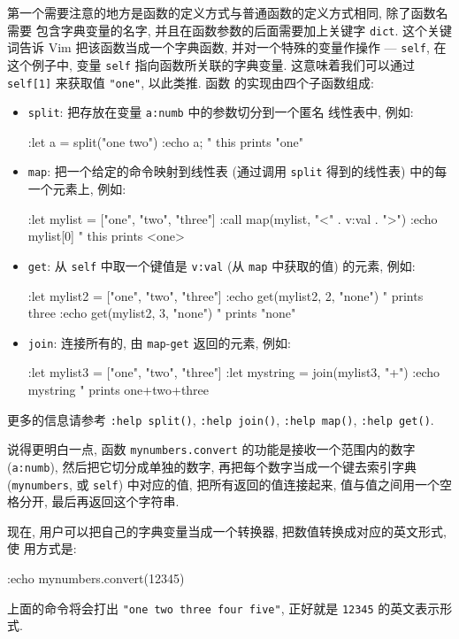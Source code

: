 第一个需要注意的地方是函数的定义方式与普通函数的定义方式相同, 除了函数名需要
包含字典变量的名字, 并且在函数参数的后面需要加上关键字 \texttt{dict}.
这个关键词告诉 Vim 把该函数当成一个字典函数, 并对一个特殊的变量作操作 ---
\texttt{self}, 在这个例子中, 变量 \texttt{self} 指向函数所关联的字典变量.
这意味着我们可以通过 \texttt{self[1]} 来获取值 \texttt{"one"}, 以此类推. 函数
的实现由四个子函数组成:
\begin{itemize}
    \item \texttt{split}: 把存放在变量 \texttt{a:numb} 中的参数切分到一个匿名
        线性表中, 例如:
    \begin{vimcode}
    :let a = split("one two")
    :echo a;    " this prints "one"
    \end{vimcode}
\item \texttt{map}: 把一个给定的命令映射到线性表 (通过调用 \texttt{split}
    得到的线性表) 中的每一个元素上, 例如:
    \begin{vimcode}
    :let mylist = ["one", "two", "three"]
    :call map(mylist, "<" . v:val . ">")
    :echo mylist[0] " this prints <one>
    \end{vimcode}
\item \texttt{get}: 从 \texttt{self} 中取一个键值是 \texttt{v:val} (从
    \texttt{map} 中获取的值) 的元素, 例如:
    \begin{vimcode}
    :let mylist2 = ["one", "two", "three"]
    :echo get(mylist2, 2, "none") " prints three
    :echo get(mylist2, 3, "none") " prints "none"
    \end{vimcode}
\item \texttt{join}: 连接所有的, 由 \texttt{map}-\texttt{get} 返回的元素,
    例如:
    \begin{vimcode}
    :let mylist3 = ["one", "two", "three"]
    :let mystring = join(mylist3, "+")
    :echo mystring " prints one+two+three
    \end{vimcode}
\end{itemize}
更多的信息请参考 \texttt{:help split()}, \texttt{:help join()},
\texttt{:help map()}, \texttt{:help get()}.

说得更明白一点, 函数 \texttt{mynumbers.convert} 的功能是接收一个范围内的数字
(\texttt{a:numb}), 然后把它切分成单独的数字, 再把每个数字当成一个键去索引字典
(\texttt{mynumbers}, 或 \texttt{self}) 中对应的值, 把所有返回的值连接起来,
值与值之间用一个空格分开, 最后再返回这个字符串.

现在, 用户可以把自己的字典变量当成一个转换器, 把数值转换成对应的英文形式, 使
用方式是:
\begin{vimcode}
:echo mynumbers.convert(12345)
\end{vimcode}
上面的命令将会打出 \texttt{"one two three four five"}, 正好就是 \texttt{12345}
的英文表示形式.  %

